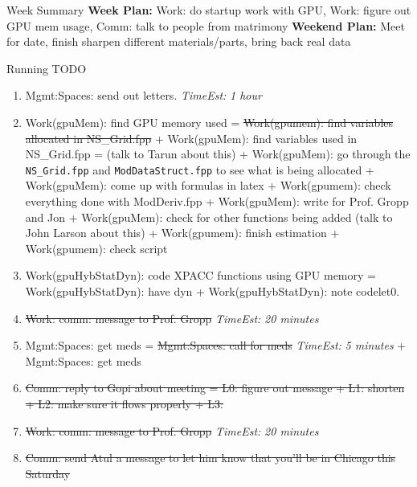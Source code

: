 \documentclass[serif, mathserif, final]{beamer}
\newcommand{\doneTaskNoItem}[1]{\sout{#1}}
\newcommand{\doneTask}[1]{\tiny \item \tiny \sout{#1}}
\newcommand{\te}[1]{\textit{TimeEst:} \textit{#1}}
\begin{document}
\begin{frame}
\begin{columns}
    \begin{column}{0.50\linewidth}
      \begin{block}{Week Summary}
        {\tiny \textbf{Week Plan:}
          Work: do startup work with GPU, Work: figure out GPU mem
          usage, Comm: talk to people from matrimony}
        {\tiny \textbf{Weekend Plan:} Meet for date, finish
          sharpen different materials/parts, bring back real data} 
      \end{block}

      \begin{block}{Running TODO} %
        \begin{enumerate}
        \item \small Mgmt:Spaces: send out letters. \te{1 hour}           
        
        \item \small Work(gpuMem): find GPU memory used  =
          \doneTaskNoItem{ Work(gpumem): find variables allocated in
            NS\_Grid.fpp} + Work(gpuMem): find variables used in NS\_Grid.fpp = (talk to Tarun about this) +
          Work(gpuMem): go through the {\tt NS\_Grid.fpp} and
          {\tt ModDataStruct.fpp} to see what is being allocated + Work(gpuMem): come up with
          formulas in latex + Work(gpumem): check everything done with ModDeriv.fpp +
          Work(gpuMem): write for Prof. Gropp and Jon  + Work(gpuMem): check
          for other functions being added (talk to John Larson about
          this) + Work(gpumem): finish estimation  + Work(gpumem):
          check script 

        \item \small Work(gpuHybStatDyn): code XPACC functions using
          GPU memory = Work(gpuHybStatDyn): have dyn +
          Work(gpuHybStatDyn): note codelet0. 
          
          \doneTask{Work: comm: message to Prof. Gropp}  \te{20 minutes} 

        \item \small Mgmt:Spaces: get meds  = \doneTaskNoItem{Mgmt:Spaces: call for meds} \te{5 minutes}
          +  Mgmt:Spaces: get meds 

        \doneTask{ Comm: reply to Gopi about meeting = L0: figure
          out message + L1: shorten  + L2: make sure it flows properly
          + L3: } 
        \doneTask{Work: comm: message to Prof. Gropp}  \te{20 minutes}  
        \doneTask{Comm: send Atul a message to let him know that
          you'll be in Chicago this Saturday}



\end{enumerate}
\end{block}
\end{column}
\end{columns}
\end{frame}
\end{document}
